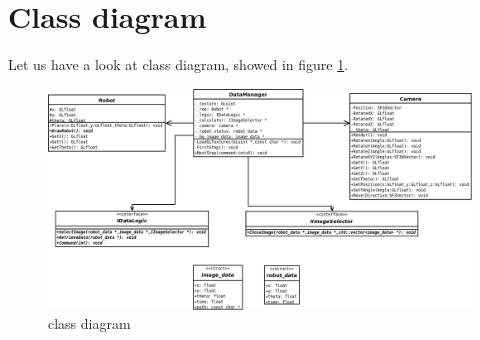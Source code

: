 \section{Class diagram}
\label{rear:classdiagram}

Let us have a look at \framework{} class diagram, 
showed in figure \ref{fig:class_diagram}.

{
\begin{figure}[!h]
  \begin{center}
    \includegraphics[width=\textheight, angle=270]{img/rear_class_diagram.png}
    \caption{\framework{} class diagram}
    \label{fig:class_diagram}
  \end{center}
\end{figure}
}

